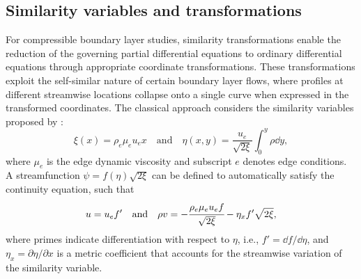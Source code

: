 

\subsection{Similarity variables and transformations}
For compressible boundary layer studies, similarity transformations enable the reduction of the governing partial differential equations to ordinary differential equations through appropriate coordinate transformations. These transformations exploit the self-similar nature of certain boundary layer flows, where profiles at different streamwise locations collapse onto a single curve when expressed in the transformed coordinates. The classical approach considers the similarity variables proposed by \cite{Lees1956}:
\begin{equation}
    \xi(x) = \rho_e \mu_e u_e x \quad \text{and} \quad \eta(x,y) = \frac{u_e}{\sqrt{2\xi}} \int_{0}^{y} \rho \dd y,
\end{equation}
where $\mu_e$ is the edge dynamic viscosity and subscript $e$ denotes edge conditions. A streamfunction $\psi = f(\eta)\sqrt{2\xi}$ can be defined to automatically satisfy the continuity equation, such that 
\begin{equation}
    u = u_e f' \quad \text{and} \quad \rho v = - \cfrac{\rho_e \mu_e u_e f}{\sqrt{2\xi}} - \eta_x f' \sqrt{2\xi},
\end{equation}
where primes indicate differentiation with respect to $\eta$, i.e., $f' = \dd f/\dd\eta$, and $\eta_x = \partial\eta/\partial x$ is a metric coefficient that accounts for the streamwise variation of the similarity variable.

